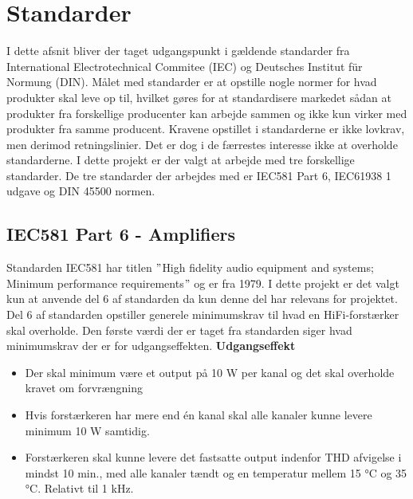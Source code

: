 \section{Standarder}
I dette afsnit bliver der taget udgangspunkt i gældende standarder fra International Electrotechnical Commitee (IEC) og Deutsches Institut f\"{u}r Normung (DIN). Målet med standarder er at opstille nogle normer for hvad produkter skal leve op til, hvilket gøres for at standardisere markedet sådan at produkter fra forskellige producenter kan arbejde sammen og ikke kun virker med produkter fra samme producent. Kravene opstillet i standarderne er ikke lovkrav, men derimod retningslinier. Det er dog i de færrestes interesse ikke at overholde standarderne.
\newline
\newline
I dette projekt er der valgt at arbejde med tre forskellige standarder. De tre standarder der arbejdes med er IEC581 Part 6, IEC61938 1 udgave og DIN 45500 normen.


\subsection*{IEC581 Part 6 - Amplifiers}
\label{IEC581}
Standarden IEC581 har titlen $"$High fidelity audio equipment and systems; Minimum performance requirements$"$ og er fra 1979. I dette projekt er det valgt kun at anvende del 6 af standarden da kun denne del har relevans for projektet. Del 6 af standarden opstiller generele minimumskrav til hvad en HiFi-forstærker skal overholde. \cite{IEC581-6}%
\newline
\newline
Den første værdi der er taget fra standarden siger hvad minimumskrav der er for udgangseffekten.
\newline
\newline
\textbf{Udgangseffekt}
\begin{itemize}
\item Der skal minimum være et output på 10 W per kanal og det skal overholde kravet om forvrængning
\item Hvis forstærkeren har mere end én kanal skal alle kanaler kunne levere minimum 10 W samtidig.
\item Forstærkeren skal kunne levere det fastsatte output indenfor THD afvigelse i mindst 10 min., med alle kanaler tændt og en temperatur mellem 15 °C og 35 °C. Relativt til 1 kHz.
\end{itemize}

